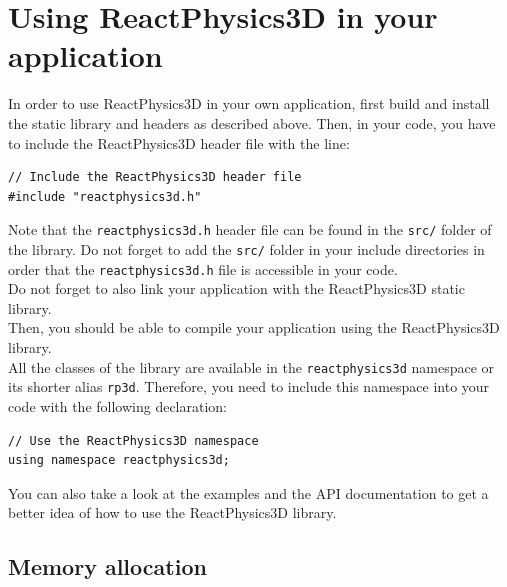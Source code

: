 \documentclass[a4paper,12pt]{article}
\begin{document}
    \section{Using ReactPhysics3D in your application}

    In order to use ReactPhysics3D in your own application, first build
    and install the static library and headers as described above.
    Then, in your code, you have to include
    the ReactPhysics3D header file with the line: \\

    \begin{lstlisting}
// Include the ReactPhysics3D header file
#include "reactphysics3d.h"
  \end{lstlisting}

    \vspace{0.6cm}

    Note that the \texttt{reactphysics3d.h} header file can be found in the
    \texttt{src/} folder of the library. Do not forget to add the
    \texttt{src/} folder in your include directories in order that the
    \texttt{reactphysics3d.h} file is accessible in your code. \\

    Do not forget to also link your application with the ReactPhysics3D
    static library.  \\

    Then, you should be able to compile your application using the
    ReactPhysics3D library. \\

    All the classes of the library are available in the \texttt{reactphysics3d} namespace or its shorter alias
    \texttt{rp3d}. Therefore, you need to include this namespace into your code with the following declaration: \\

    \begin{lstlisting}
// Use the ReactPhysics3D namespace
using namespace reactphysics3d;
    \end{lstlisting}

    \vspace{0.6cm}

    You can also take a look at the examples and the API documentation to get a better idea of how to use the
    ReactPhysics3D library.
   
   \subsection{Memory allocation}
\end{document}
